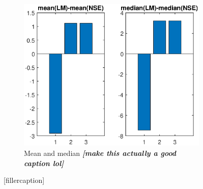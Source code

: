 \begin{figure}[ht]
\begin{subfigure}{0.50\linewidth}
\label{fig:flightCoopGoodMeanMed}
\end{subfigure}
\\
\begin{center}
\begin{subfigure}{0.50\linewidth}
\centering
\includegraphics[scale=0.6]{figures/flight_results/Coop_bar.eps}
\caption{Mean and median \textit{\textbf{[make this actually a good caption lol]}}}
\label{fig:flightCoopGoodUnweightSum}
\end{subfigure}
\end{center}
\caption{[fillercaption]}
\label{fig:flightCoopMeanMed}
\end{figure}



